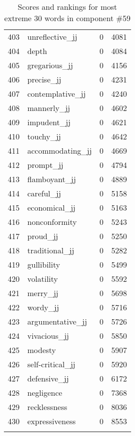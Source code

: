 \begin{longtable}[!htbp]{| rlr@{.}l |}
    403 & unreflective\_jj & 0 & 4081 \\
    404 & depth & 0 & 4084 \\
    405 & gregarious\_jj & 0 & 4156 \\
    406 & precise\_jj & 0 & 4231 \\
    407 & contemplative\_jj & 0 & 4240 \\
    408 & mannerly\_jj & 0 & 4602 \\
    409 & impudent\_jj & 0 & 4621 \\
    410 & touchy\_jj & 0 & 4642 \\
    411 & accommodating\_jj & 0 & 4669 \\
    412 & prompt\_jj & 0 & 4794 \\
    413 & flamboyant\_jj & 0 & 4889 \\
    414 & careful\_jj & 0 & 5158 \\
    415 & economical\_jj & 0 & 5163 \\
    416 & nonconformity & 0 & 5243 \\
    417 & proud\_jj & 0 & 5250 \\
    418 & traditional\_jj & 0 & 5282 \\
    419 & gullibility & 0 & 5499 \\
    420 & volatility & 0 & 5592 \\
    421 & merry\_jj & 0 & 5698 \\
    422 & wordy\_jj & 0 & 5716 \\
    423 & argumentative\_jj & 0 & 5726 \\
    424 & vivacious\_jj & 0 & 5850 \\
    425 & modesty & 0 & 5907 \\
    426 & self-critical\_jj & 0 & 5920 \\
    427 & defensive\_jj & 0 & 6172 \\
    428 & negligence & 0 & 7368 \\
    429 & recklessness & 0 & 8036 \\
    430 & expressiveness & 0 & 8553 \\
    \hline
    \caption{Scores and rankings for most extreme 30 words in component \#59} \\
\end{longtable}
